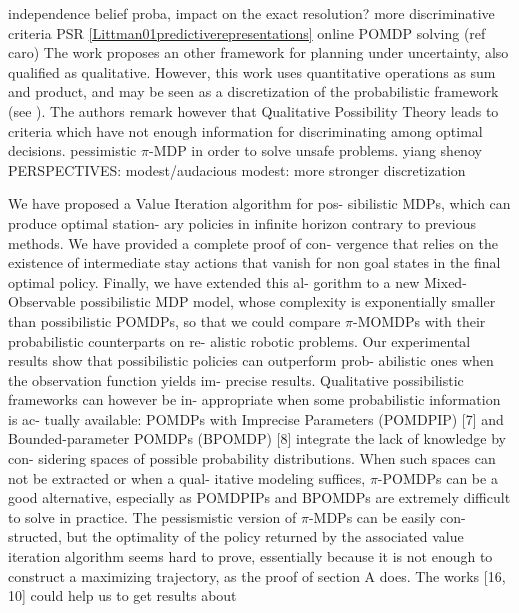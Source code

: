independence belief proba, impact on the exact resolution?
\cite{LIP61723} more discriminative criteria
PSR \ref{Littman01predictiverepresentations}
online POMDP solving (ref caro)
The work \cite{Bonet:2002:QMP:2073876.2073884} proposes an other framework
for planning under uncertainty, also qualified as qualitative. 
However, this work uses quantitative operations
as sum and product, and may be seen as a discretization of the probabilistic framework
(see \cite{Wilson:1995:OMC:2074158.2074221}).
The authors remark however that Qualitative Possibility Theory leads to 
criteria which have not enough information for discriminating
among optimal decisions.
pessimistic $\pi$-MDP in order to solve unsafe problems. yiang shenoy
PERSPECTIVES: modest/audacious
modest: more stronger discretization













We have proposed a Value Iteration algorithm for pos-
sibilistic  MDPs,  which  can  produce  optimal  station-
ary  policies  in  infinite  horizon  contrary  to  previous
methods.  We have provided a complete proof of con-
vergence  that  relies  on  the  existence  of  intermediate
stay actions that vanish for non goal states in the final optimal policy. 
Finally, we have extended this al-
gorithm to a new Mixed-Observable possibilistic MDP
model, whose complexity is exponentially smaller than
possibilistic  POMDPs,  so  that  we  could  compare
$\pi$-MOMDPs with their probabilistic counterparts on re-
alistic  robotic  problems.    Our  experimental  results
show  that  possibilistic  policies  can  outperform  prob-
abilistic ones when the observation function yields im-
precise results.
Qualitative possibilistic frameworks can however be in-
appropriate when some probabilistic information is ac-
tually available:  POMDPs with Imprecise Parameters
(POMDPIP)  [7]  and  Bounded-parameter  POMDPs
(BPOMDP) [8] integrate the lack of knowledge by con-
sidering  spaces  of  possible  probability  distributions.
When such spaces can not be extracted or when a qual-
itative  modeling  suffices, $\pi$-POMDPs  can  be  a  good
alternative, especially as POMDPIPs and BPOMDPs
are  extremely  difficult to solve in practice.
The pessismistic version of $\pi$-MDPs can be easily con-
structed, but the optimality of the policy returned by
the associated value iteration algorithm seems hard to
prove, essentially because it is not enough to construct
a maximizing trajectory, as the proof of section A does.
The works [16, 10] could help us to get results about


